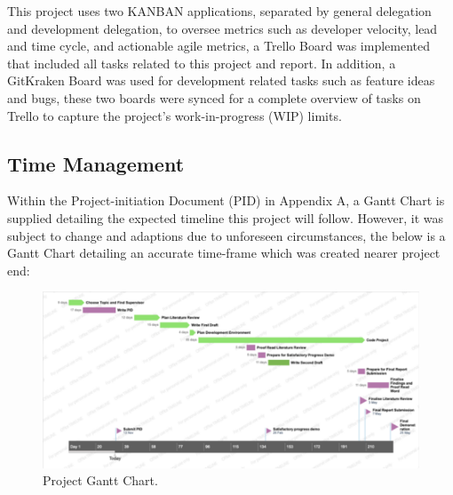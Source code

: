 This project uses two KANBAN applications, separated by general delegation and development delegation, to oversee metrics such as developer velocity, lead and time cycle, and actionable agile metrics, a Trello Board was implemented that included all tasks related to this project and report. In addition, a GitKraken Board was used for development related tasks such as feature ideas and bugs, these two boards were synced for a complete overview of tasks on Trello to capture the project’s work-in-progress (WIP) limits.

\subsection{Time Management}

Within the Project-initiation Document (PID) in Appendix A, a Gantt Chart is supplied detailing the expected timeline this project will follow. However, it was subject to change and adaptions due to unforeseen circumstances, the below is a Gantt Chart detailing an accurate time-frame which was created nearer project end:

\begin{figure}[H]
    \centering
    \includegraphics[width=\textwidth]{figures/chapter-3/ProjectGanttChart.pdf}
    \caption[Project Gantt Chart]{Project Gantt Chart.
    \label{fig:ProjectGanttChart}}
\end{figure}
